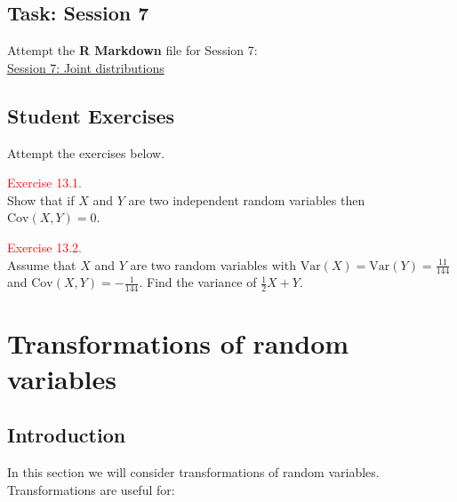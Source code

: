 \documentclass[
]{book}
\begin{document}
\hfill\break

\hypertarget{Correlation:lab}{%
\section*{\texorpdfstring{{\textbf{Task: Session 7}}}{Task: Session 7}}\label{Correlation:lab}}

Attempt the \textbf{R Markdown} file for Session 7:\\
\href{https://moodle.nottingham.ac.uk/course/view.php?id=134982\#section-2}{Session 7: Joint distributions}

\hfill\break

\hypertarget{Correlation:exer}{%
\section*{\texorpdfstring{{\textbf{Student Exercises}}}{Student Exercises}}\label{Correlation:exer}}

Attempt the exercises below.

\leavevmode{}%
\textcolor{red}{Exercise 13.1.}\\
Show that if \(X\) and \(Y\) are two independent random variables then \(\text{Cov} (X,Y) =0\).

\hfill\break

\leavevmode{}%
\textcolor{red}{Exercise 13.2.}\\
Assume that \(X\) and \(Y\) are two random variables with \(\text{Var}(X) = \text{Var}(Y) = \frac{11}{144}\) and \(\text{Cov}(X,Y) = -\frac{1}{144}\). Find the variance of \(\frac{1}{2} X + Y\).

\hypertarget{Transform}{%
\chapter{Transformations of random variables}\label{Transform}}

\hypertarget{Transform:intro}{%
\section{Introduction}\label{Transform:intro}}

In this section we will consider transformations of random variables. Transformations are useful for:
\end{document}
